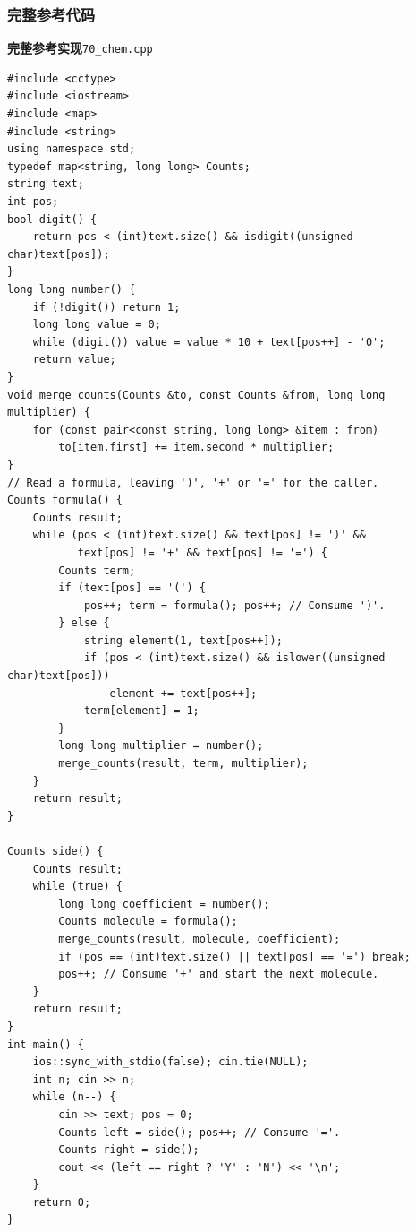 \documentclass[UTF8,11pt,a4paper,fontset=none]{ctexart}
\begin{document}
\subsubsection{完整参考代码}
\par\noindent\begin{minipage}{\linewidth}
\textbf{完整参考实现}\quad\texttt{70\_chem.cpp}
\begin{lstlisting}[basicstyle=\ttfamily\footnotesize\linespread{0.94}\selectfont]
#include <cctype>
#include <iostream>
#include <map>
#include <string>
using namespace std;
typedef map<string, long long> Counts;
string text;
int pos;
bool digit() {
    return pos < (int)text.size() && isdigit((unsigned char)text[pos]);
}
long long number() {
    if (!digit()) return 1;
    long long value = 0;
    while (digit()) value = value * 10 + text[pos++] - '0';
    return value;
}
void merge_counts(Counts &to, const Counts &from, long long multiplier) {
    for (const pair<const string, long long> &item : from)
        to[item.first] += item.second * multiplier;
}
// Read a formula, leaving ')', '+' or '=' for the caller.
Counts formula() {
    Counts result;
    while (pos < (int)text.size() && text[pos] != ')' &&
           text[pos] != '+' && text[pos] != '=') {
        Counts term;
        if (text[pos] == '(') {
            pos++; term = formula(); pos++; // Consume ')'.
        } else {
            string element(1, text[pos++]);
            if (pos < (int)text.size() && islower((unsigned char)text[pos]))
                element += text[pos++];
            term[element] = 1;
        }
        long long multiplier = number();
        merge_counts(result, term, multiplier);
    }
    return result;
}

Counts side() {
    Counts result;
    while (true) {
        long long coefficient = number();
        Counts molecule = formula();
        merge_counts(result, molecule, coefficient);
        if (pos == (int)text.size() || text[pos] == '=') break;
        pos++; // Consume '+' and start the next molecule.
    }
    return result;
}
int main() {
    ios::sync_with_stdio(false); cin.tie(NULL);
    int n; cin >> n;
    while (n--) {
        cin >> text; pos = 0;
        Counts left = side(); pos++; // Consume '='.
        Counts right = side();
        cout << (left == right ? 'Y' : 'N') << '\n';
    }
    return 0;
}
\end{lstlisting}
\end{minipage}\par
\end{document}
